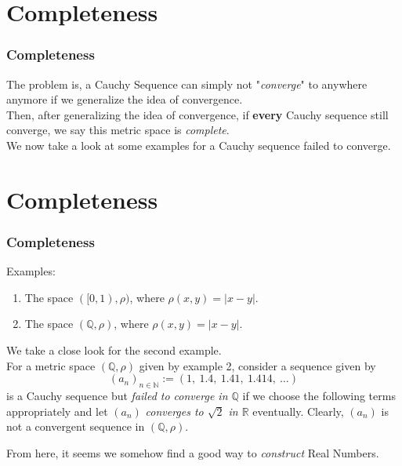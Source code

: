 \documentclass[12pt, t]{beamer}
\renewcommand{\emph}[1]{{\color{Turquoise3}\textsl{#1}}}
\begin{document}
\section{Completeness}
\begin{frame}
    \frametitle{Completeness}
    The problem is, a Cauchy Sequence can simply not "\emph{converge}" to anywhere anymore if we generalize the idea of convergence.\\
    \vspace{0.5em}
    Then, after generalizing the idea of convergence, if \textbf{every} Cauchy sequence still converge, we say this metric space is
    \emph{complete}.\\
    \vspace{0.5em}
    We now take a look at some examples for a Cauchy sequence failed to converge.

\end{frame}

\section{Completeness}
\begin{frame}
    \frametitle{Completeness}
    Examples:
    \begin{enumerate}
        \item The space $([0,1),\rho)$, where $\rho(x,y)=|x-y|$.
        \item The space $(\mathbb{Q},\rho)$, where $\rho(x,y)=|x-y|$.
    \end{enumerate}
    \vspace{1em}
    We take a close look for the second example.\\

    For a metric space $(\mathbb{Q},\rho)$ given by example 2, consider a sequence given by
    \begin{equation*}
        (a_n)_{n\in\mathbb{N}}:=(1,\ 1.4,\ 1.41,\ 1.414,\ \dots)
    \end{equation*}
    is a Cauchy sequence but \emph{failed to converge in $\mathbb{Q}$} if we choose the following terms appropriately and let $(a_n)$ \emph{converges
        to $\sqrt{2}$ in $\mathbb{R}$} eventually. Clearly, $(a_n)$ is not a convergent sequence in $(\mathbb{Q},\rho)$.
    \vspace{0,5em}

    From here, it seems we somehow find a good way to \emph{construct} Real Numbers.
\end{frame}
\end{document}
